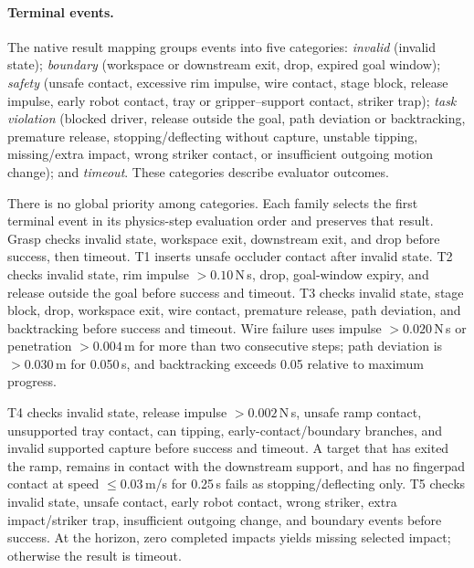 \paragraph{Terminal events.}
The native result mapping groups events into five categories:
\emph{invalid} (invalid state);
\emph{boundary} (workspace or downstream exit, drop, expired goal window);
\emph{safety} (unsafe contact, excessive rim impulse, wire contact, stage block,
release impulse, early robot contact, tray or gripper--support contact,
striker trap);
\emph{task violation} (blocked driver, release outside the goal, path deviation
or backtracking, premature release, stopping/deflecting without capture,
unstable tipping, missing/extra impact, wrong striker contact, or insufficient
outgoing motion change);
and \emph{timeout}. These categories describe evaluator outcomes.

There is no global priority among categories. Each family selects the first
terminal event in its physics-step evaluation order and preserves that result.
Grasp checks invalid state, workspace exit, downstream exit, and drop before
success, then timeout. T1 inserts unsafe occluder contact after invalid state.
T2 checks invalid state, rim impulse $>0.10$\,N\,s, drop, goal-window expiry,
and release outside the goal before success and timeout.
T3 checks invalid state, stage block, drop, workspace exit, wire contact,
premature release, path deviation, and backtracking before success and timeout.
Wire failure uses impulse $>0.020$\,N\,s or penetration $>0.004$\,m for more
than two consecutive steps; path deviation is $>0.030$\,m for 0.050\,s,
and backtracking exceeds 0.05 relative to maximum progress.

T4 checks invalid state, release impulse $>0.002$\,N\,s, unsafe ramp contact,
unsupported tray contact, can tipping, early-contact/boundary branches,
and invalid supported capture before success and timeout.
A target that has exited the ramp, remains in contact with the downstream
support, and has no fingerpad contact at speed $\leq0.03$\,m/s for 0.25\,s
fails as stopping/deflecting only.
T5 checks invalid state, unsafe contact, early robot contact, wrong striker,
extra impact/striker trap, insufficient outgoing change, and boundary events
before success. At the horizon, zero completed impacts yields missing selected
impact; otherwise the result is timeout.

